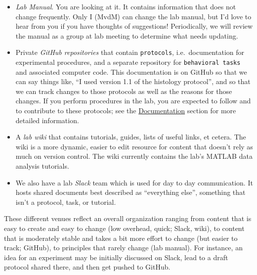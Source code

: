 \documentclass{tufte-book}
\newcommand{\doccls}[1]{\texttt{#1}}%
\begin{document}
\begin{itemize}
\item{{\it Lab Manual}. You are looking at it. It contains information
  that does not change frequently. Only I (MvdM) can change the lab
  manual, but I'd love to hear from you if you have thoughts of
  suggestions! Periodically, we will review the manual as a group at
  lab meeting to determine what needs updating.}
\item{Private {\it GitHub
    repositories} that contain \doccls{protocols},
  i.e.\ documentation for experimental procedures, and a separate repository for
  \doccls{behavioral tasks} and associated computer
  code. This documentation is on GitHub
  so that we can say things like, ``I used version 1.1 of the
  histology protocol'', and so that we can track changes to those
  protocols as well as the reasons for those changes. If you perform
  procedures in the lab, you are expected to follow and to contribute
  to these protocols; see the \href{sec:notes}{Documentation} section for
  more detailed information.}
\item{A {\it lab
    wiki} that
  contains tutorials, guides, lists of useful links, et cetera. The
  wiki is a more dynamic, easier to edit resource for content that
  doesn't rely as much on version control. The wiki currently contains
  the lab's MATLAB data analysis tutorials.}
\item{We also have a lab {\it Slack}
  team
  which is used for day to day communication. It hosts shared
  documents best described as ``everything else'', something that
  isn't a protocol, task, or tutorial.}
\end{itemize}

These different venues reflect an overall organization ranging from
content that is easy to create and easy to change (low overhead,
quick; Slack, wiki), to content that is moderately stable and takes a
bit more effort to change (but easier to track; GitHub), to principles
that rarely change (lab manual). For instance, an idea for an
experiment may be initially discussed on Slack, lead to a draft
protocol shared there, and then get pushed to GitHub. 
\end{document}

